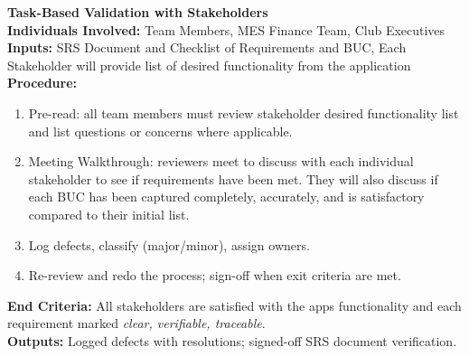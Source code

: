 \documentclass[12pt, titlepage]{article}
\begin{document}



\noindent\textbf{Task-Based Validation with Stakeholders} \\
\noindent\textbf{Individuals Involved:} Team Members, MES Finance Team, Club Executives \\
\noindent\textbf{Inputs:} SRS Document and Checklist of Requirements and BUC, Each Stakeholder will provide list of desired functionality from the application \\
\noindent\textbf{Procedure:}
\begin{enumerate}
  \item Pre-read: all team members must review stakeholder desired functionality list and list questions or concerns where applicable.
  \item Meeting Walkthrough: reviewers meet to discuss with each individual stakeholder to see if requirements have been met.
  They will also discuss if each BUC has been captured completely, accurately, and is satisfactory compared to their initial list.
  \item Log defects, classify (major/minor), assign owners.
  \item Re-review and redo the process; sign-off when exit criteria are met.
\end{enumerate}
\noindent\textbf{End Criteria:} All stakeholders are satisfied with the apps functionality and each requirement marked \emph{clear, verifiable, traceable}. \\
\noindent\textbf{Outputs:} Logged defects with resolutions; signed-off SRS document verification. 
\end{document}
